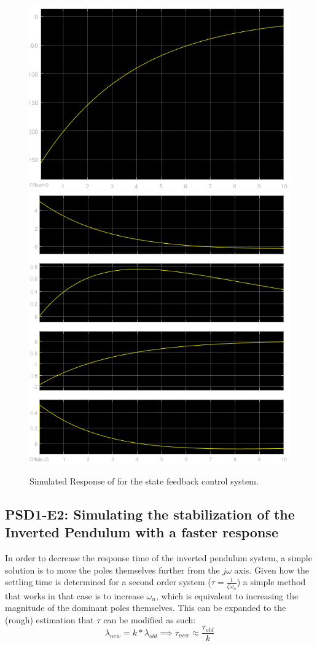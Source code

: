 \documentclass[]{article}
\begin{document}
		\begin{figure}[p]
			\centering
			\includegraphics[width=0.7\linewidth]{Fig/PSD_ControlSignal_1}
			\includegraphics[width=0.7\linewidth]{Fig/PSD_SystemResponse_1}
			\caption{Simulated Response of for the state feedback control system.}
			\label{fig:psdsimulation1}
		\end{figure}
	
	\newpage
		\subsection{PSD1-E2: Simulating the stabilization of the Inverted Pendulum with a faster response}
			In order to decrease the response time of the inverted pendulum system, a simple solution is to move the poles themselves further from the $j\omega$ axis. Given how the settling time is determined for a second order system ($\tau = \frac{1}{\zeta \omega_n}$) a simple method that works in that case is to increase $\omega_n$, which is equivalent to increasing the magnitude of the dominant poles themselves. This can be expanded to the (rough) estimation that $\tau$ can be modified as such:
			\begin{equation}
				\lambda_{new} = k * \lambda_{old} \implies \tau_{new} \approx \frac{\tau_{old}}{k} 
			\end{equation}
			
\end{document}
